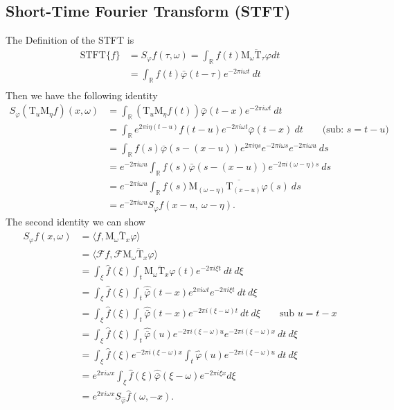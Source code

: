 \subsection{Short-Time Fourier Transform (STFT)}
The Definition of the STFT is
\begin{align}
    \text{STFT}\{f\} &= S_\varphi f(\tau, \omega) = \int_\mathbb{R} f(t)
    \overline{\text{M}_\omega \text{T}_\tau \varphi}dt \\
                 &=\int_\mathbb{R} f(t)
    \bar{\varphi}(t - \tau)e^{-2\pi i \omega t}\ dt \\
\end{align}
Then we have the following identity
\begin{align}
    S_\varphi(\text{T}_u\text{M}_\eta f)(x,\omega)
    &= \int_\mathbb{R}
     \left(\text{T}_u \text{M}_\eta f(t)\right) \bar{\varphi}(t-x) e^{-2\pi i
         \omega t}\ dt\\
    &= \int_\mathbb{R} e^{2\pi i \eta(t-u)}f(t-u) e^{-2\pi i \omega
    t}\bar{\varphi}(t-x)\ dt \qquad \text{(sub: $s = t-u$)}\\
    &= \int_\mathbb{R} f(s)\bar{\varphi}(s-(x-u))e^{2\pi i \eta s}e^{-2\pi i
    \omega s} e^{-2\pi i \omega u}\ ds \\
    &=e^{-2\pi i \omega u}\int_\mathbb{R} f(s) \bar{\varphi}(s-(x-u))e^{-2\pi i
    (\omega - \eta)s}\ ds\\
    &=e^{-2\pi i \omega u}\int_\mathbb{R}
    f(s)\overline{ \text{M}_{(\omega-\eta)} \text{T}_{(x-u)}\varphi(s)}\ ds\\
    &=e^{-2\pi i \omega u} S_\varphi f\left(x-u,\ \omega -\eta\right).
\end{align}
The second identity we can show
\begin{align}
    S_\varphi f(x, \omega)
    &= \langle f, \overline{\text{M}_\omega \text{T}_x \varphi}\rangle \\
    &= \langle\mathcal{F} f, \mathcal{F} \overline{\text{M}_\omega \text{T}_x \varphi}\rangle \\
    &= \int_\xi \hat{f}(\xi)\int_t \overline{\text{M}_\omega \text{T}_x
    \varphi}(t) e^{-2\pi i \xi t}\ dt\ d\xi \\
    &= \int_\xi \hat{f}(\xi)\int_t \hat{\bar{\varphi}}(t-x) e^{2\pi i \omega
    t} e^{-2\pi i \xi t}\ dt\ d\xi \\
    &= \int_\xi \hat{f}(\xi)\int_t \hat{\bar{\varphi}}(t-x)e^{-2\pi i (\xi
    -\omega)t}\ dt\ d\xi \qquad \text{sub $u=t-x$}\\
    &= \int_\xi \hat{f}(\xi)\int_t \hat{\bar{\varphi}}(u)e^{-2\pi i (\xi
    -\omega)u}e^{-2\pi i (\xi -\omega)x} \ dt\ d\xi\\
    &= \int_\xi \hat{f}(\xi)e^{-2\pi i (\xi -\omega)x}\int_t
    \hat{\varphi}(u)e^{-2\pi i (\xi -\omega)u} \ dt\ d\xi\\ &= e^{2\pi i
    \omega x}\int_\xi \hat{f}(\xi) \hat{\bar{\varphi}}(\xi - \omega) e^{-2\pi
    i \xi x}d\xi\\
    &= e^{2\pi i \omega x} S_{\hat{\varphi}} \hat{f}(\omega, -x).
\end{align}

